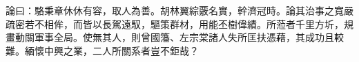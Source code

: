 \begin{pinyinscope}
論曰：駱秉章休休有容，取人為善。胡林翼綜覈名實，幹濟冠時。論其治事之寬嚴疏密若不相侔，而皆以長駕遠馭，驅策群材，用能丕樹偉績。所蒞者千里方圻，規畫動關軍事全局。使無其人，則曾國籓、左宗棠諸人失所匡扶憑藉，其成功且較難。緬懷中興之業，二人所關系者豈不鉅哉？


\end{pinyinscope}